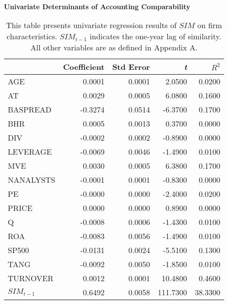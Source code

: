 \begin{table}[H]
\footnotesize
\centering
\captionsetup{width=.95\textwidth}																
 \caption{\textbf{Univariate Determinants of Accounting Comparability}}  								
 \label{cossim-uni}																				
\caption*{\footnotesize This table presents univariate regression results of $SIM$ on firm characteristics. $SIM_{t-1}$ indicates the one-year lag of similarity. All other variables are as defined in Appendix A.}
\begin{tabular}{lrrrr}
  \hline
 & Coefficient & Std Error & \emph{t} & $R^2$\\ 
  \hline
AGE & 0.0001 & 0.0001 & 2.0500 & 0.0200 \\ 
AT & 0.0029 & 0.0005 & 6.0800 & 0.1600 \\ 
BASPREAD & -0.3274 & 0.0514 & -6.3700 & 0.1700 \\ 
BHR & 0.0005 & 0.0013 & 0.3700 & 0.0000 \\ 
DIV & -0.0002 & 0.0002 & -0.8900 & 0.0000 \\ 
LEVERAGE & -0.0069 & 0.0046 & -1.4900 & 0.0100 \\ 
MVE & 0.0030 & 0.0005 & 6.3800 & 0.1700 \\ 
NANALYSTS & -0.0001 & 0.0001 & -0.8300 & 0.0000 \\ 
PE & -0.0000 & 0.0000 & -2.4000 & 0.0200 \\ 
PRICE & 0.0000 & 0.0000 & 0.8900 & 0.0000 \\ 
Q & -0.0008 & 0.0006 & -1.4300 & 0.0100 \\ 
ROA & -0.0083 & 0.0056 & -1.4900 & 0.0100 \\ 
SP500 & -0.0131 & 0.0024 & -5.5100 & 0.1300 \\ 
TANG & -0.0092 & 0.0050 & -1.8500 & 0.0100 \\ 
TURNOVER & 0.0012 & 0.0001 & 10.4800 & 0.4600 \\ 
$SIM_{t-1}$ & 0.6492 & 0.0058 & 111.7300 & 38.3300 \\
   \hline
\end{tabular}
\end{table}
